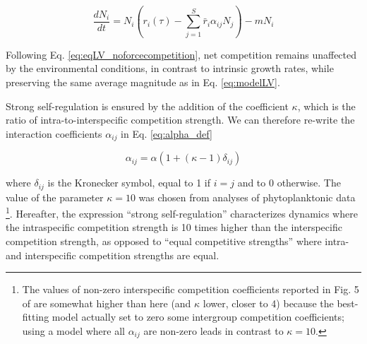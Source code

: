 \documentclass[smallcondensed,referee]{svjour3}       %
\begin{document}
\begin{equation}
\frac{dN_{i}}{dt}=N_{i}\left(r_{i}(\tau)-\sum_{j=1}^{S}\bar{r}_{i}\alpha_{ij}N_{j}\right)-mN_{i}\label{eq:eqLV_noforcecompetition}
\end{equation}

Following Eq. \ref{eq:eqLV_noforcecompetition}, net competition remains
unaffected by the environmental conditions, in contrast to intrinsic
growth rates, while preserving the same average magnitude as in Eq.
\ref{eq:modelLV}.

Strong self-regulation is ensured by the addition of the coefficient
$\kappa$, which is the ratio of intra-to-interspecific competition
strength. We can therefore re-write the interaction coefficients $\alpha_{ij}$
in Eq. \ref{eq:alpha_def}

\begin{equation}
\alpha_{ij}=\alpha\left(1+(\kappa-1)\delta_{ij}\right)\label{eq:alpha_def}
\end{equation}

where $\delta_{ij}$ is the Kronecker symbol, equal to 1 if $i=j$
and to 0 otherwise. The value of the parameter $\kappa=10$ was chosen
from analyses of phytoplanktonic data \citep{barraquand2018coastal}\footnote{The values of non-zero interspecific competition coefficients reported
in Fig. 5 of \citet{barraquand2018coastal} are somewhat higher than
here (and $\kappa$ lower, closer to 4) because the best-fitting model
actually set to zero some intergroup competition coefficients; using
a model where all $\alpha_{ij}$ are non-zero leads in contrast to
$\kappa=10$.}. Hereafter, the expression ``strong self-regulation'' characterizes
dynamics where the intraspecific competition strength is 10 times
higher than the interspecific competition strength, as opposed to
``equal competitive strengths'' where intra- and interspecific competition
strengths are equal. 
\end{document}

